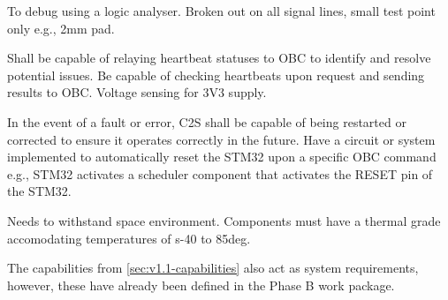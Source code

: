 {To debug using a logic analyser.}
{Broken out on all signal lines, small test point only e.g., 2mm pad.}

{Shall be capable of relaying heartbeat statuses to OBC to identify and resolve potential issues.}
{Be capable of checking heartbeats upon request and sending results to OBC. Voltage sensing for 3V3 supply.}

{In the event of a fault or error, C2S shall be capable of being restarted or corrected to ensure it operates correctly in the future.}
{Have a circuit or system implemented to automatically reset the STM32 upon a specific OBC command e.g., STM32 activates a scheduler component that activates the RESET pin of the STM32.}


{Needs to withstand space environment.}
{Components must have a thermal grade accomodating temperatures of s-40 to 85deg.}

The capabilities from \autoref{sec:v1.1-capabilities} also act as system requirements, however, these have already been defined in the Phase B work package.
